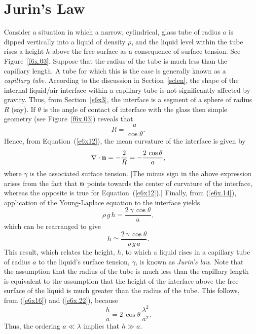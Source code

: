 \section{Jurin's Law}
Consider a situation in which a narrow, cylindrical,  glass tube of radius $a$ is
dipped vertically  into a liquid of density $\rho$, and the liquid level within the tube rises a height $h$ above the free surface
 as a consequence of surface tension. See Figure~\ref{f6x.03}. Suppose that the radius of the
 tube  is much less than the capillary length. A tube for which this is the case is generally
known as a {\em capillary tube}. 
 According to the discussion in  Section~\ref{sclen}, the shape of the internal liquid/air interface within a capillary tube
  is not significantly affected by gravity.  Thus,  from Section~\ref{s6x3}, the interface is
 a segment of a sphere of radius $R$ (say). If $\theta$ is the angle of contact of interface with the glass then  simple geometry (see Figure~\ref{f6x.03}) reveals that 
 \begin{equation}
 R = \frac{a}{\cos\theta}.
 \end{equation}
 Hence, from Equation~(\ref{e6x12}), the mean curvature of the interface is given by
 \begin{equation}
 \nabla\cdot{\bf n} = -\frac{2}{R} =- \frac{2\,\cos\theta}{a},
 \end{equation}
 where $\gamma$ is the associated surface tension. [The minus sign in the above expression arises from the
 fact that ${\bf n}$ points towards the center of curvature of the interface, whereas the opposite is true for Equation~(\ref{e6x12}).] Finally, from
 (\ref{e6x.14}), application of the Young-Laplace equation to the interface yields
 \begin{equation}
 \rho\,g\,h = \frac{2\,\gamma\,\cos\theta}{a},
 \end{equation}
 which  can be rearranged to give
 \begin{equation}\label{e6x.22}
 h \simeq  \frac{2\,\gamma\,\cos\theta}{\rho\,g\,a}.
 \end{equation}
 This result, which relates the height, $h$, to which a liquid rises in a capillary tube of radius $a$ to the
liquid's  surface tension, $\gamma$, is known as {\em Jurin's law}. 
Note that the assumption that the radius of the tube is much less than the capillary length
is equivalent to the assumption that the height  of the interface above the free surface of the
liquid is much greater than the radius of the tube.
This follows, from (\ref{e6x16}) and (\ref{e6x.22}), because
\begin{equation}
\frac{h}{a} = 2\,\cos\theta\,\frac{\lambda^2}{a^2}.
\end{equation}
Thus, the ordering $a\ll \lambda$  implies that $h\gg a$. 

